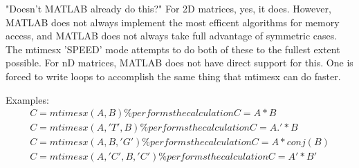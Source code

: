 \documentclass{Note}
\begin{document}
"Doesn't MATLAB already do this?"  For 2D matrices, yes, it does. However, MATLAB does not always implement the most efficent algorithms for memory access, and MATLAB does not always take full advantage of symmetric cases. The mtimesx 'SPEED' mode attempts to do  both of these to the fullest extent possible. For nD matrices, MATLAB does not have direct support for this. One is forced to write loops to accomplish the same thing that mtimesx can do faster.

 Examples:
\begin{equation}
\begin{aligned}
  C = mtimesx(A,B)         \% performs the calculation C = A * B\\
  C = mtimesx(A,'T',B)     \% performs the calculation C = A.' * B\\
  C = mtimesx(A,B,'G')     \% performs the calculation C = A * conj(B)\\
  C = mtimesx(A,'C',B,'C')   \% performs the calculation C = A' * B'\\
\end{aligned}
\end{equation}
\end{document}
